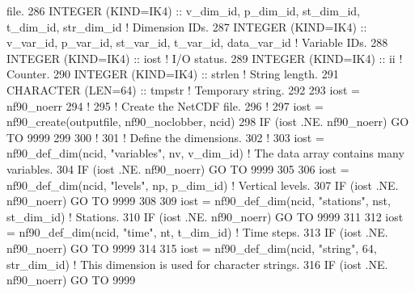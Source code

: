 \begin{DoxyCode}
{       file.}
286     \textcolor{keywordtype}{INTEGER (KIND=IK4)}          :: v\_dim\_id, p\_dim\_id, st\_dim\_id, t\_dim\_id, str\_dim\_id  \textcolor{comment}{! Dimension IDs.}
287     \textcolor{keywordtype}{INTEGER (KIND=IK4)}          :: v\_var\_id, p\_var\_id, st\_var\_id, t\_var\_id, data\_var\_id \textcolor{comment}{! Variable IDs.}
288     \textcolor{keywordtype}{INTEGER (KIND=IK4)}          :: iost                                                 \textcolor{comment}{! I/O status.}
289     \textcolor{keywordtype}{INTEGER (KIND=IK4)}          :: ii                                                   \textcolor{comment}{! Counter.}
290     \textcolor{keywordtype}{INTEGER (KIND=IK4)}          :: strlen                                               \textcolor{comment}{! String length.}
291     \textcolor{keywordtype}{CHARACTER (LEN=64)}          :: tmpstr                                               \textcolor{comment}{! Temporary string.}
292 
293     iost    = nf90\_noerr
294     \textcolor{comment}{!}
295     \textcolor{comment}{! Create the NetCDF file.}
296     \textcolor{comment}{!}
297     iost    = nf90\_create(outputfile, nf90\_noclobber, ncid)
298     \textcolor{keywordflow}{IF} (iost .NE. nf90\_noerr) \textcolor{keywordflow}{GO TO} 9999
299 
300     \textcolor{comment}{!}
301     \textcolor{comment}{! Define the dimensions.}
302     \textcolor{comment}{!}
303     iost    = nf90\_def\_dim(ncid, \textcolor{stringliteral}{"variables"}, nv, v\_dim\_id)     \textcolor{comment}{! The data array contains many variables.}
304     \textcolor{keywordflow}{IF} (iost .NE. nf90\_noerr) \textcolor{keywordflow}{GO TO} 9999
305 
306     iost    = nf90\_def\_dim(ncid, \textcolor{stringliteral}{"levels"}, np, p\_dim\_id)        \textcolor{comment}{! Vertical levels.}
307     \textcolor{keywordflow}{IF} (iost .NE. nf90\_noerr) \textcolor{keywordflow}{GO TO} 9999
308 
309     iost    = nf90\_def\_dim(ncid, \textcolor{stringliteral}{"stations"}, nst, st\_dim\_id)    \textcolor{comment}{! Stations.}
310     \textcolor{keywordflow}{IF} (iost .NE. nf90\_noerr) \textcolor{keywordflow}{GO TO} 9999
311 
312     iost    = nf90\_def\_dim(ncid, \textcolor{stringliteral}{"time"}, nt, t\_dim\_id)          \textcolor{comment}{! Time steps.}
313     \textcolor{keywordflow}{IF} (iost .NE. nf90\_noerr) \textcolor{keywordflow}{GO TO} 9999
314 
315     iost    = nf90\_def\_dim(ncid, \textcolor{stringliteral}{"string"}, 64, str\_dim\_id)      \textcolor{comment}{! This dimension is used for character
       strings.}
316     \textcolor{keywordflow}{IF} (iost .NE. nf90\_noerr) \textcolor{keywordflow}{GO TO} 9999

\end{DoxyCode}
